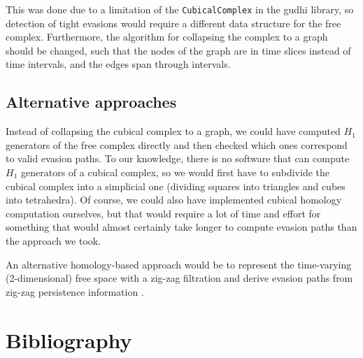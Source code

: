 \documentclass{article}
\begin{document}
This was done due to a limitation of the \texttt{CubicalComplex} in the gudhi library, so detection of tight evasions would require a different data structure for the free complex.
Furthermore, the algorithm for collapsing the complex to a graph should be changed, such that the nodes of the graph are in time slices instead of time intervals, and the edges span through intervals.

\subsection*{Alternative approaches}

Instead of collapsing the cubical complex to a graph, we could have computed $H_1$ generators of the free complex directly and then checked which ones correspond to valid evasion paths. To our knowledge, there is no software that can compute $H_1$ generators of a cubical complex, so we
would first have to subdivide the cubical complex into a simplicial one (dividing squares into triangles and cubes into tetrahedra). Of course, we could also have implemented cubical homology computation ourselves, but that would require a lot of time and effort for something that would almost certainly take longer to compute evasion paths than the approach we took.

An alternative homology-based approach would be to
represent the time-varying (2-dimensional) free space with a zig-zag filtration and derive evasion paths from zig-zag persistence information \cite{Adams_2014}.


\section{Bibliography}

\printbibliography
\end{document}
